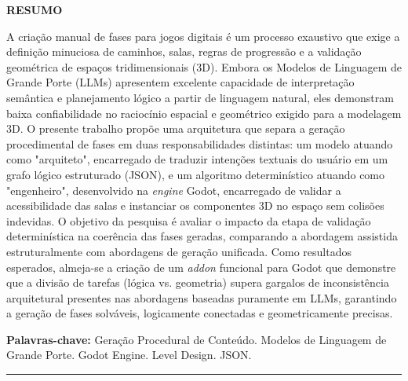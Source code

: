 \documentclass[
  12pt,
  a4paper,
  oneside,
  article,
  brazil
]{abntex2}
\begin{document}
{\centering\textbf{RESUMO}\par}
\vspace{0.1cm}
\begin{SingleSpace}
\noindent
A criação manual de fases para jogos digitais é um processo exaustivo que exige a definição minuciosa de caminhos, salas, regras de progressão e a validação geométrica de espaços tridimensionais (3D). Embora os Modelos de Linguagem de Grande Porte (LLMs) apresentem excelente capacidade de interpretação semântica e planejamento lógico a partir de linguagem natural, eles demonstram baixa confiabilidade no raciocínio espacial e geométrico exigido para a modelagem 3D. O presente trabalho propõe uma arquitetura que separa a geração procedimental de fases em duas responsabilidades distintas: um modelo atuando como "arquiteto", encarregado de traduzir intenções textuais do usuário em um grafo lógico estruturado (JSON), e um algoritmo determinístico atuando como "engenheiro", desenvolvido na \textit{engine} Godot, encarregado de validar a acessibilidade das salas e instanciar os componentes 3D no espaço sem colisões indevidas. O objetivo da pesquisa é avaliar o impacto da etapa de validação determinística na coerência das fases geradas, comparando a abordagem assistida estruturalmente com abordagens de geração unificada. Como resultados esperados, almeja-se a criação de um \textit{addon} funcional para Godot que demonstre que a divisão de tarefas (lógica vs. geometria) supera gargalos de inconsistência arquitetural presentes nas abordagens baseadas puramente em LLMs, garantindo a geração de fases solváveis, logicamente conectadas e geometricamente precisas.

\vspace{0.3cm}
\noindent\textbf{Palavras-chave:} Geração Procedural de Conteúdo. Modelos de Linguagem de Grande Porte. Godot Engine. Level Design. JSON.
\end{SingleSpace}

\vspace{0.1cm}
\noindent\rule{\linewidth}{0.4pt}
\vspace{0.1cm}
\end{document}
